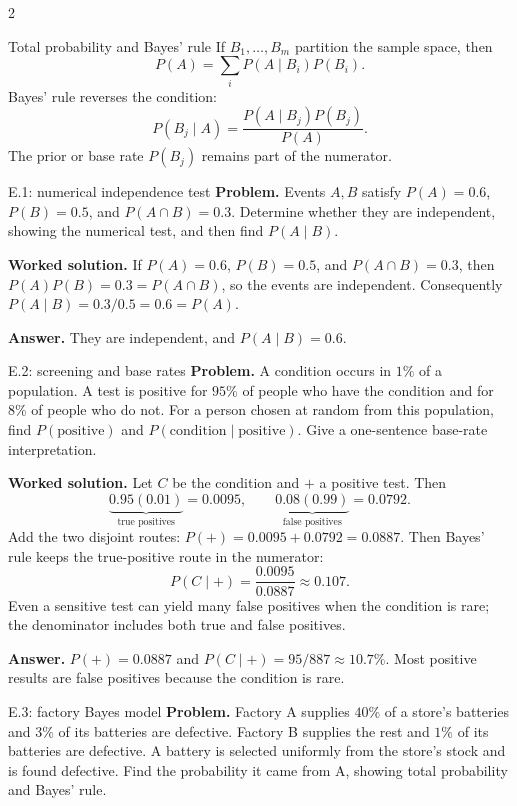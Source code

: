 \documentclass[10pt]{article}
\begin{document}
\begin{multicols}{2}
\begin{definitionbox}{Total probability and Bayes' rule}
If $B_1,\ldots,B_m$ partition the sample space, then
\[
P(A)=\sum_i P(A\mid B_i)P(B_i).
\]
Bayes' rule reverses the condition:
\[
P(B_j\mid A)=\frac{P(A\mid B_j)P(B_j)}{P(A)}.
\]
The prior or base rate $P(B_j)$ remains part of the numerator.
\end{definitionbox}

\begin{workedbox}{E.1: numerical independence test}
\textbf{Problem.} Events $A,B$ satisfy $P(A)=0.6$, $P(B)=0.5$, and $P(A\cap B)=0.3$. Determine whether they are independent, showing the numerical test, and then find $P(A\mid B)$.

\textbf{Worked solution.} If $P(A)=0.6$, $P(B)=0.5$, and $P(A\cap B)=0.3$, then
$P(A)P(B)=0.3=P(A\cap B)$, so the events are independent. Consequently
$P(A\mid B)=0.3/0.5=0.6=P(A)$.

\textbf{Answer.} They are independent, and $P(A\mid B)=0.6$.
\end{workedbox}

\begin{workedbox}{E.2: screening and base rates}
\textbf{Problem.} A condition occurs in $1\%$ of a population. A test is positive for $95\%$ of people who have the condition and for $8\%$ of people who do not. For a person chosen at random from this population, find $P(\text{positive})$ and $P(\text{condition}\mid\text{positive})$. Give a one-sentence base-rate interpretation.

\textbf{Worked solution.} Let $C$ be the condition and $+$ a positive test. Then
\[
\underbrace{0.95(0.01)}_{\text{true positives}}=0.0095,
\qquad
\underbrace{0.08(0.99)}_{\text{false positives}}=0.0792.
\]
Add the two disjoint routes: $P(+)=0.0095+0.0792=0.0887$. Then Bayes' rule
keeps the true-positive route in the numerator:
\[
P(C\mid +)=\frac{0.0095}{0.0887}\approx0.107.
\]
Even a sensitive test can yield many false positives when the condition is
rare; the denominator includes both true and false positives.

\textbf{Answer.} $P(+)=0.0887$ and $P(C\mid +)=95/887\approx10.7\%$. Most positive results are false positives because the condition is rare.
\end{workedbox}

\begin{workedbox}{E.3: factory Bayes model}
\textbf{Problem.} Factory A supplies $40\%$ of a store's batteries and $3\%$ of its batteries are defective. Factory B supplies the rest and $1\%$ of its batteries are defective. A battery is selected uniformly from the store's stock and is found defective. Find the probability it came from A, showing total probability and Bayes' rule.


\end{workedbox}
\end{multicols}
\end{document}
